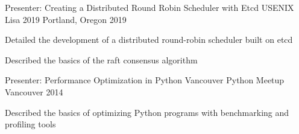 

\begin{cventries}

  \cventry
    {Presenter: Creating a Distributed Round Robin Scheduler with Etcd} %
    {USENIX Lisa 2019} %
    {Portland, Oregon} %
    {2019} %
    {
      \begin{cvitems} %
        \item {Detailed the development of a distributed round-robin scheduler built on etcd}
        \item {Described the basics of the raft consensus algorithm}
      \end{cvitems}
    }

  \cventry
    {Presenter: Performance Optimization in Python} %
    {Vancouver Python Meetup} %
    {Vancouver} %
    {2014} %
    {
      \begin{cvitems} %
        \item {Described the basics of optimizing Python programs with benchmarking and profiling tools}
      \end{cvitems}
    }

\end{cventries}
